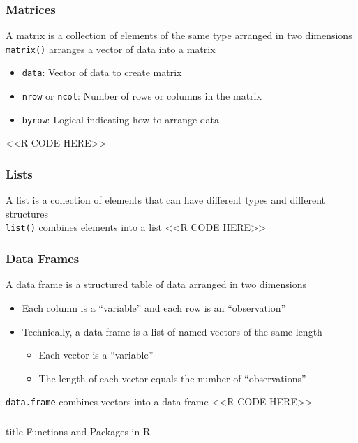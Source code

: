 \documentclass{beamer}
\begin{document}
\begin{frame}[fragile]\frametitle{Matrices}
    A matrix is a collection of elements of the same type arranged in two dimensions \\
    \vspace{3ex}
    \texttt{matrix()} arranges a vector of data into a matrix
    \begin{itemize}
        \item \texttt{data}: Vector of data to create matrix
        \item \texttt{nrow} or \texttt{ncol}: Number of rows or columns in the matrix
        \item \texttt{byrow}: Logical indicating how to arrange data
    \end{itemize}
    <<R CODE HERE>>
\end{frame}

\begin{frame}[fragile]\frametitle{Lists}
    A list is a collection of elements that can have different types and different structures \\
    \vspace{3ex}
    \texttt{list()} combines elements into a list
    <<R CODE HERE>>
\end{frame}

\begin{frame}[fragile]\frametitle{Data Frames}
    A data frame is a structured table of data arranged in two dimensions
    \begin{itemize}
        \item Each column is a ``variable'' and each row is an ``observation''
        \item Technically, a data frame is a list of named vectors of the same length
        \begin{itemize}
            \item Each vector is a ``variable''
            \item The length of each vector equals the number of ``observations''
        \end{itemize}
    \end{itemize}
    \vspace{3ex}
    \texttt{data.frame} combines vectors into a data frame
    <<R CODE HERE>>
\end{frame}

\begin{frame}\frametitle{}
    \vfill
    \centering
    \begin{beamercolorbox}[center]{title}
        \Large Functions and Packages in R
    \end{beamercolorbox}
    \vfill
\end{frame}
\end{document}
